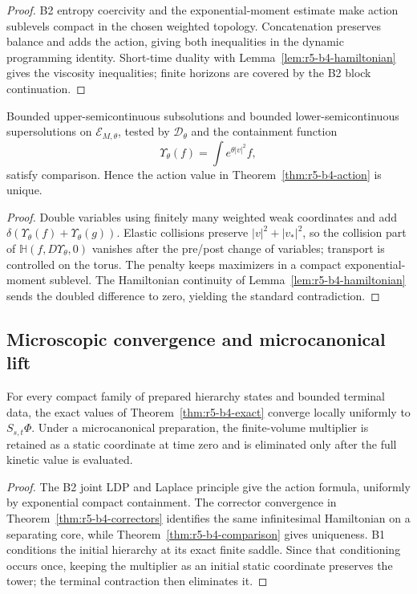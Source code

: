 \begin{proof}
B2 entropy coercivity and the exponential-moment estimate make action
sublevels compact in the chosen weighted topology.  Concatenation preserves
balance and adds the action, giving both inequalities in the dynamic
programming identity.  Short-time duality with
Lemma~\ref{lem:r5-b4-hamiltonian} gives the viscosity inequalities; finite
horizons are covered by the B2 block continuation.
\end{proof}

\begin{theorem}
\label{thm:r5-b4-comparison}
Bounded upper-semicontinuous subsolutions and bounded lower-semicontinuous
supersolutions on \({\mathcal E}_{M,\theta}\), tested by
\({\mathscr D}_\theta\) and the containment function
\[
 \Upsilon_\theta(f)=\int e^{\theta|v|^2}f,
\]
satisfy comparison.  Hence the action value in
Theorem~\ref{thm:r5-b4-action} is unique.
\end{theorem}

\begin{proof}
Double variables using finitely many weighted weak coordinates and add
\(\delta(\Upsilon_\theta(f)+\Upsilon_\theta(g))\).  Elastic collisions
preserve \(|v|^2+|v_*|^2\), so the collision part of
\({\mathbb H}(f,D\Upsilon_\theta,0)\) vanishes after the pre/post change of
variables; transport is controlled on the torus.  The penalty keeps
maximizers in a compact exponential-moment sublevel.  The Hamiltonian
continuity of Lemma~\ref{lem:r5-b4-hamiltonian} sends the doubled difference
to zero, yielding the standard contradiction.
\end{proof}

\subsection{Microscopic convergence and microcanonical lift}

\begin{theorem}
\label{thm:r5-b4-limit}
For every compact family of prepared hierarchy states and bounded terminal
data, the exact values of
Theorem~\ref{thm:r5-b4-exact} converge locally uniformly to
\(S_{s,t}\Phi\).  Under a microcanonical preparation, the finite-volume
multiplier is retained as a static coordinate at time zero and is eliminated
only after the full kinetic value is evaluated.
\end{theorem}

\begin{proof}
The B2 joint LDP and Laplace principle give the action formula, uniformly by
exponential compact containment.  The corrector convergence in
Theorem~\ref{thm:r5-b4-correctors} identifies the same infinitesimal
Hamiltonian on a separating core, while
Theorem~\ref{thm:r5-b4-comparison} gives uniqueness.  B1 conditions the
initial hierarchy at its exact finite saddle.  Since that conditioning occurs
once, keeping the multiplier as an initial static coordinate preserves the
tower; the terminal contraction then eliminates it.
\end{proof}

